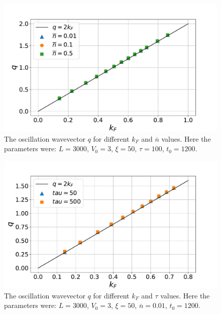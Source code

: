 \documentclass[aps,prl,preprint,groupedaddress]{revtex4-1}
\begin{document}
\begin{figure}
	\centering
	\includegraphics[width=0.7\linewidth]{../figures/q_vs_kf_differentnbar}
	\caption{The oscillation wavevector $q$ for different $k_F$ and $\overline{n}$ values. Here the parameters were: $L =3000$, $V_0 = 3$, $\xi = 50$, $\tau = 100$, $t_0 = 1200$.}
	\label{fig:qvskfdifferentnbar}
\end{figure}

\begin{figure}
	\centering
	\includegraphics[width=0.7\linewidth]{../figures/q_vs_kf_differenttau}
	\caption{The oscillation wavevector $q$ for different $k_F$ and $\tau$ values. Here the parameters were: $L =3000$, $V_0 = 3$, $\xi = 50$, $\overline{n} = 0.01$, $t_0 = 1200$.}
	\label{fig:qvskfdifferenttau}
\end{figure}
\end{document}
